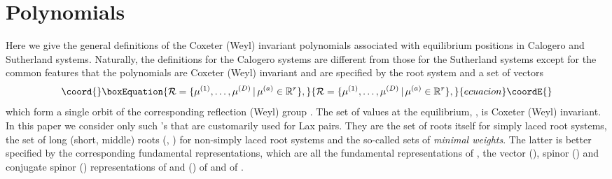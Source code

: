 \documentclass[a4paper,12pt]{article}
\begin{document}
\section{Polynomials}
\label{polydef}
\setcounter{equation}{0}

Here we give the general definitions of the Coxeter (Weyl) invariant
polynomials associated with equilibrium positions in Calogero and
Sutherland systems. Naturally, the definitions for the Calogero systems
are different from those for the Sutherland systems except for the common
features that the polynomials are Coxeter (Weyl) invariant and are
specified by the root system \myHighlight{$\Delta$}\coordHE{} and a set of \coordHE{} vectors \coordHE{}
\begin{equation}\coord{}\boxEquation{
   {\cal R}=\{\mu^{(1)},\ldots,\mu^{(D)}\,|\,\mu^{(a)}\in {\mathbb R}^r\},
}{
   {\cal R}=\{\mu^{(1)},\ldots,\mu^{(D)}\,|\,\mu^{(a)}\in {\mathbb R}^r\},
}{ecuacion}\coordE{}\end{equation}
which form a single orbit of the corresponding reflection (Weyl) group
\coordHE{}. The set of values at the equilibrium,
\coordHE{}, is Coxeter (Weyl) invariant.
In this paper we consider only such \coordHE{}'s that are customarily
used for Lax pairs.
They are the set of roots \myHighlight{$\Delta$}\coordHE{} itself for simply laced root systems,
the set of long (short, middle) roots \coordHE{} (\coordHE{}, \coordHE{})
for non-simply laced root  systems and the so-called sets of
{\em minimal weights\/}.
The latter is better specified by the corresponding fundamental
representations, which are all the fundamental representations of \coordHE{},
the vector (\coordHE{}), spinor (\coordHE{}) and conjugate spinor (\coordHE{})
representations of \coordHE{} and \coordHE{} (\coordHE{}) of \coordHE{}
and \coordHE{} of \coordHE{}.
\end{document}
